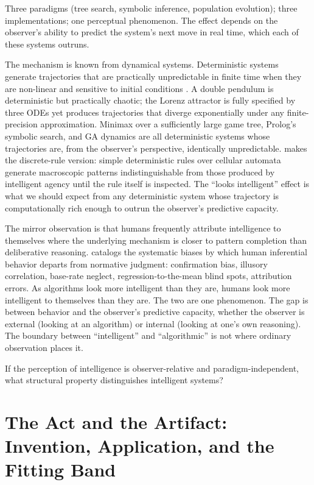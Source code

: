 \documentclass[11pt]{article}
\begin{document}
Three paradigms (tree search, symbolic inference, population evolution); three implementations; one perceptual phenomenon. The effect depends on the observer's ability to predict the system's next move in real time, which each of these systems outruns.

The mechanism is known from dynamical systems. Deterministic systems generate trajectories that are practically unpredictable in finite time when they are non-linear and sensitive to initial conditions \citep{arnold_ode}. A double pendulum is deterministic but practically chaotic; the Lorenz attractor is fully specified by three ODEs yet produces trajectories that diverge exponentially under any finite-precision approximation. Minimax over a sufficiently large game tree, Prolog's symbolic search, and GA dynamics are all deterministic systems whose trajectories are, from the observer's perspective, identically unpredictable. \citet{wolfram2002} makes the discrete-rule version: simple deterministic rules over cellular automata generate macroscopic patterns indistinguishable from those produced by intelligent agency until the rule itself is inspected. The ``looks intelligent'' effect is what we should expect from any deterministic system whose trajectory is computationally rich enough to outrun the observer's predictive capacity.

The mirror observation is that humans frequently attribute intelligence to themselves where the underlying mechanism is closer to pattern completion than deliberative reasoning. \citet{gilovich1991} catalogs the systematic biases by which human inferential behavior departs from normative judgment: confirmation bias, illusory correlation, base-rate neglect, regression-to-the-mean blind spots, attribution errors. As algorithms look more intelligent than they are, humans look more intelligent to themselves than they are. The two are one phenomenon. The gap is between behavior and the observer's predictive capacity, whether the observer is external (looking at an algorithm) or internal (looking at one's own reasoning). The boundary between ``intelligent'' and ``algorithmic'' is not where ordinary observation places it.

If the perception of intelligence is observer-relative and paradigm-independent, what structural property distinguishes intelligent systems?

\section{The Act and the Artifact: Invention, Application, and the Fitting Band}\label{sec:discriminator}
\end{document}
